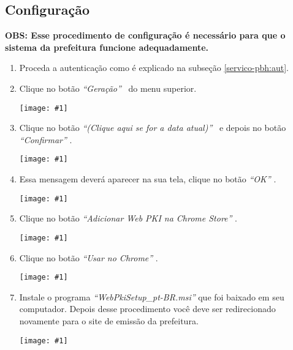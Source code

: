 \documentclass{article}
\newcommand{\itasp}[1]{
  \textit{``#1''}
}
\newcommand{\imagem}[2]{
  \begin{center}
    \texttt{[image: \#1]}
  \end{center}
}
\begin{document}
\subsection{Configuração}
\label{servico-pbh:config}
\textbf{OBS: Esse procedimento de configuração é necessário para que o sistema da prefeitura funcione adequadamente.}
\begin{enumerate}
  \item Proceda a autenticação como é explicado na subseção \ref{servico-pbh:aut}.
  \item Clique no botão \itasp{Geração} \ do menu superior. \imagem{menu-nota-pbh}{0.9}
  \pagebreak
  \item Clique no botão \itasp{(Clique aqui se for a data atual)} \ e depois no botão \itasp{Confirmar}. \imagem{emissao-popup}{0.4}
  \item Essa mensagem deverá aparecer na sua tela, clique no botão \itasp{OK}. \imagem{msg-pki}{0.5}
  \item Clique no botão \itasp{Adicionar Web PKI na Chrome Store}. \imagem{install-pki-1}{0.7}
  \item Clique no botão \itasp{Usar no Chrome}. \imagem{install-pki-2}{1}
  \pagebreak
  \item Instale o programa \itasp{WebPkiSetup\_pt-BR.msi} que foi baixado em seu computador. Depois desse procedimento você deve ser redirecionado novamente para o site de emissão da prefeitura. \imagem{install-pki-3}{0.8}
\end{enumerate}
\end{document}
